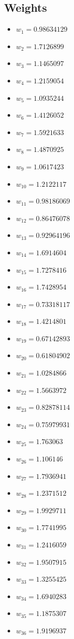 \documentclass[11pt]{article}
\begin{document}
\subsection*{Weights}
\begin{itemize}
\item $w_{1} = 0.98634129$
\item $w_{2} = 1.7126899$
\item $w_{3} = 1.1465097$
\item $w_{4} = 1.2159054$
\item $w_{5} = 1.0935244$
\item $w_{6} = 1.4126052$
\item $w_{7} = 1.5921633$
\item $w_{8} = 1.4870925$
\item $w_{9} = 1.0617423$
\item $w_{10} = 1.2122117$
\item $w_{11} = 0.98186069$
\item $w_{12} = 0.86476078$
\item $w_{13} = 0.92964196$
\item $w_{14} = 1.6914604$
\item $w_{15} = 1.7278416$
\item $w_{16} = 1.7428954$
\item $w_{17} = 0.73318117$
\item $w_{18} = 1.4214801$
\item $w_{19} = 0.67142893$
\item $w_{20} = 0.61804902$
\item $w_{21} = 1.0284866$
\item $w_{22} = 1.5663972$
\item $w_{23} = 0.82878114$
\item $w_{24} = 0.75979931$
\item $w_{25} = 1.763063$
\item $w_{26} = 1.106146$
\item $w_{27} = 1.7936941$
\item $w_{28} = 1.2371512$
\item $w_{29} = 1.9929711$
\item $w_{30} = 1.7741995$
\item $w_{31} = 1.2416059$
\item $w_{32} = 1.9507915$
\item $w_{33} = 1.3255425$
\item $w_{34} = 1.6940283$
\item $w_{35} = 1.1875307$
\item $w_{36} = 1.9196937$

\end{itemize}
\end{document}
